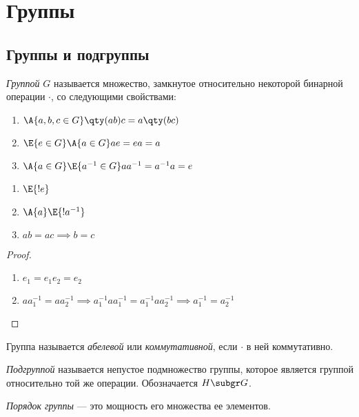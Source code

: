 \section{Группы}
\subsection{Группы и подгруппы}

\begin{definition}
  \emph{Группой} $G$ называется множество, замкнутое относительно некоторой бинарной операции $\cdotp$, со следующими свойствами:
  \begin{enumerate}
    \item $\A{a,b,c \in G}\qty(ab)c=a\qty(bc)$
    \item $\E{e\in G}\A{a \in G} ae=ea=a$
    \item $\A{a\in G}\E{a^{-1}\in G} aa^{-1}=a^{-1} a=e$
  \end{enumerate}
\end{definition}

\begin{theorem}
  \theoremlistshack
  \begin{enumerate}
    \item $\E{!e}$
    \item $\A{a}\E{!a^{-1}}$
    \item $ab=ac \implies b=c$
  \end{enumerate}
\end{theorem}
\begin{proof}
  \theoremlistshack
  \begin{enumerate}
    \item $e_1=e_1e_2=e_2$
    \item $aa^{-1}_1=aa^{-1}_2 \implies a^{-1}_1aa^{-1}_1=a^{-1}_1aa^{-1}_2\implies a^{-1}_1=a^{-1}_2$
  \end{enumerate}
\end{proof}

\begin{definition}
  Группа называется \emph{абелевой} или \emph{коммутативной}, если $\cdotp$ в ней коммутативно.
\end{definition}

\begin{definition}
  \emph{Подгруппой} называется непустое подмножество группы, которое является группой относительно той же операции. Обозначается $H \subgr G$.
\end{definition}

\begin{definition}
  \emph{Порядок группы} --- это мощность его множества ее элементов.
\end{definition}

